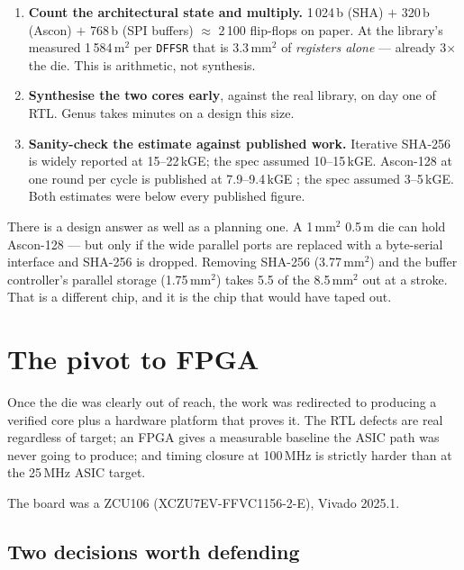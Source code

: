 \documentclass[11pt,a4paper]{article}
\begin{document}
\begin{enumerate}[nosep,leftmargin=1.6em]
\item \textbf{Count the architectural state and multiply.} 1\,024\,b (SHA)
      $+$ 320\,b (Ascon) $+$ 768\,b (SPI buffers) $\approx$ 2\,100 flip-flops
      on paper. At the library's measured 1\,584\,\textmu m$^2$ per
      \texttt{DFFSR} that is 3.3\,mm$^2$ of \emph{registers alone} --- already
      3$\times$ the die. This is arithmetic, not synthesis.
\item \textbf{Synthesise the two cores early}, against the real library, on
      day one of RTL. Genus takes minutes on a design this size.
\item \textbf{Sanity-check the estimate against published work.} Iterative
      SHA-256 is widely reported at 15--22\,kGE; the spec assumed
      10--15\,kGE. Ascon-128 at one round per cycle is published at
      7.9--9.4\,kGE \cite{ascontugraz,springer}; the spec assumed 3--5\,kGE.
      Both estimates were below every published figure.
\end{enumerate}

There is a design answer as well as a planning one. A 1\,mm$^2$ 0.5\,\textmu m
die can hold Ascon-128 --- but only if the wide parallel ports are replaced
with a byte-serial interface and SHA-256 is dropped. Removing SHA-256
(3.77\,mm$^2$) and the buffer controller's parallel storage (1.75\,mm$^2$)
takes 5.5 of the 8.5\,mm$^2$ out at a stroke. That is a different chip, and it
is the chip that would have taped out.

\section{The pivot to FPGA}\label{sec:pivot}

Once the die was clearly out of reach, the work was redirected to producing a
verified core plus a hardware platform that proves it. The RTL defects are real
regardless of target; an FPGA gives a measurable baseline the ASIC path was
never going to produce; and timing closure at 100\,MHz is strictly harder than
at the 25\,MHz ASIC target.

The board was a ZCU106 (XCZU7EV-FFVC1156-2-E), Vivado 2025.1.

\subsection{Two decisions worth defending}
\end{document}
